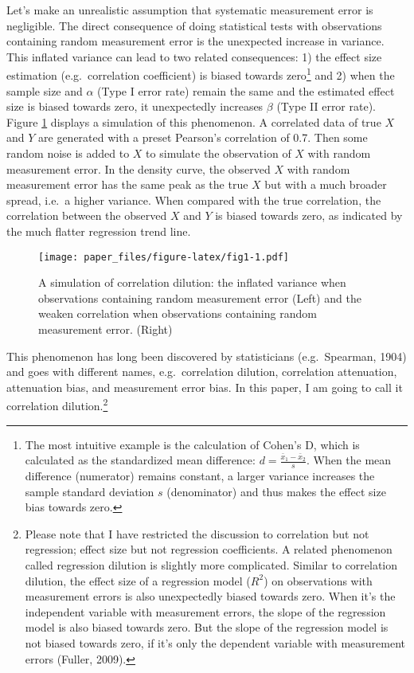 \documentclass[english,man,floatsintext]{apa6}
\begin{document}
Let's make an unrealistic assumption that systematic measurement error is negligible. The direct consequence of doing statistical tests with observations containing random measurement error is the unexpected increase in variance. This inflated variance can lead to two related consequences: 1) the effect size estimation (e.g.~correlation coefficient) is biased towards zero\footnote{The most intuitive example is the calculation of Cohen's D, which is calculated as the standardized mean difference: \(d = \frac{\bar{x}_1 - \bar{x}_2}{s}\). When the mean difference (numerator) remains constant, a larger variance increases the sample standard deviation \(s\) (denominator) and thus makes the effect size bias towards zero.} and 2) when the sample size and \(\alpha\) (Type I error rate) remain the same and the estimated effect size is biased towards zero, it unexpectedly increases \(\beta\) (Type II error rate). Figure \ref{fig:fig1} displays a simulation of this phenomenon. A correlated data of true \(X\) and \(Y\) are generated with a preset Pearson's correlation of 0.7. Then some random noise is added to \(X\) to simulate the observation of \(X\) with random measurement error. In the density curve, the observed \(X\) with random measurement error has the same peak as the true \(X\) but with a much broader spread, i.e.~a higher variance. When compared with the true correlation, the correlation between the observed \(X\) and \(Y\) is biased towards zero, as indicated by the much flatter regression trend line.

\begin{figure}
\centering
\texttt{[image: paper\_files/figure-latex/fig1-1.pdf]}
\caption{\label{fig:fig1}A simulation of correlation dilution: the inflated variance when observations containing random measurement error (Left) and the weaken correlation when observations containing random measurement error. (Right)}
\end{figure}

This phenomenon has long been discovered by statisticians (e.g.~Spearman, 1904) and goes with different names, e.g.~correlation dilution, correlation attenuation, attenuation bias, and measurement error bias. In this paper, I am going to call it correlation dilution.\footnote{Please note that I have restricted the discussion to correlation but not regression; effect size but not regression coefficients. A related phenomenon called regression dilution is slightly more complicated. Similar to correlation dilution, the effect size of a regression model (\(R^{2}\)) on observations with measurement errors is also unexpectedly biased towards zero. When it's the independent variable with measurement errors, the slope of the regression model is also biased towards zero. But the slope of the regression model is not biased towards zero, if it's only the dependent variable with measurement errors (Fuller, 2009).}
\end{document}
